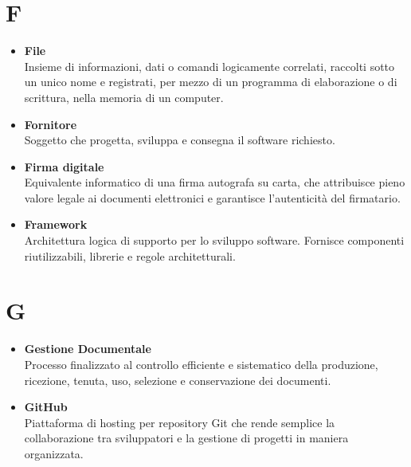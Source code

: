 \documentclass[a4paper,12pt]{article}
\begin{document}
        \section*{F} {
            \begin{itemize}
                \item \textbf{File}\\
                    Insieme di informazioni, dati o comandi logicamente correlati, raccolti sotto un unico nome e registrati, per mezzo di un programma di elaborazione o di scrittura, nella memoria di un computer.
                \item \textbf{Fornitore}\\
                    Soggetto che progetta, sviluppa e consegna il software richiesto.
                \item \textbf{Firma digitale}\\
                    Equivalente informatico di una firma autografa su carta, che attribuisce pieno valore legale ai documenti elettronici e garantisce l'autenticità del firmatario.
                \item \textbf{Framework}\\
                    Architettura logica di supporto per lo sviluppo software. Fornisce componenti riutilizzabili, librerie e regole architetturali.
            \end{itemize}
        }
        \newpage

        \section*{G} {
            \begin{itemize}
                \item \textbf{Gestione Documentale}\\
                    Processo finalizzato al controllo efficiente e sistematico della produzione, ricezione, tenuta, uso, selezione e conservazione dei documenti.
                \item \textbf{GitHub}\\
                    Piattaforma di hosting per repository Git che rende semplice la collaborazione tra sviluppatori e la gestione di progetti in maniera organizzata.
            \end{itemize}
        }
        \newpage
\end{document}
